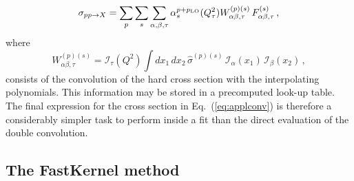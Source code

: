 \documentclass[preprint,12pt]{elsarticle}
\begin{document}
\begin{equation} \label{eq:applconv}
  \sigma_{pp\to X} = \sum_p \sum_{s}\sum_{\alpha,\beta,\tau} 
  \alpha_s^{p+p_{\rm LO}}(Q^2_\tau)W_{\alpha\beta,\tau}^{(p)(s)} \, F_{\alpha\beta,\tau}^{(s)}\,,
\end{equation}
where
\begin{equation} \label{eq:applgrid}
  W_{\alpha\beta,\tau}^{(p)(s)} = \mathcal{I}_\tau(Q^2)\int dx_1\,dx_2\,
  \hat{\sigma}^{(p)(s)}\,\mathcal{I}_\alpha(x_1)
  \,\mathcal{I}_\beta(x_2)\,,
\end{equation}
consists of the convolution of the hard cross section with the
interpolating polynomials. This information may be stored in a
precomputed look-up table.  The final expression for the cross section
in Eq.~(\ref{eq:applconv}) is therefore a considerably simpler task to perform
inside a fit than the direct evaluation of the double convolution.

\subsection{The FastKernel method}
\end{document}
